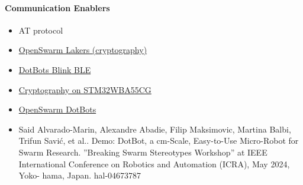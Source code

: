 \begin{frame}
    \paragraph{Communication Enablers}
    \begin{itemize}
        \item AT protocol
        \item \href{https://github.com/openwsn-berkeley/lakers}{OpenSwarm Lakers (cryptography)}
        \item \href{https://github.com/DotBots/blink}{DotBots Blink BLE}
        \item \href{https://github.com/ElsaLopez133/stm32wba55-crypto}{Cryptography on STM32WBA55CG}
        \item \href{https://github.com/DotBots/DotBot-firmware}{OpenSwarm DotBots}
        \item Said Alvarado-Marin, Alexandre Abadie, Filip Maksimovic, Martina Balbi, Trifun Savić, et al.. Demo:
        DotBot, a cm-Scale, Easy-to-Use Micro-Robot for Swarm Research. ”Breaking Swarm Stereotypes
        Workshop” at IEEE International Conference on Robotics and Automation (ICRA), May 2024, Yoko-
        hama, Japan. hal-04673787
    \end{itemize}
\end{frame}